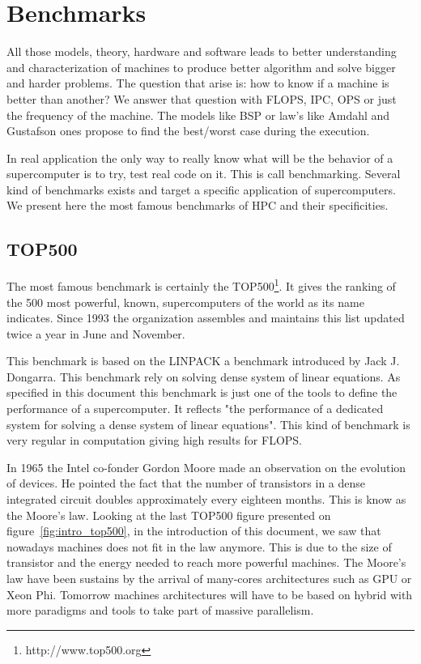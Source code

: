 \section{Benchmarks}
All those models, theory, hardware and software leads to better understanding and characterization of machines to produce better algorithm and solve bigger and harder problems. 
The question that arise is: how to know if a machine is better than another? 
We answer that question with FLOPS, IPC, OPS or just the frequency of the machine. 
The models like BSP or law's like Amdahl and Gustafson ones propose to find the best/worst case during the execution.

In real application the only way to really know what will be the behavior of a supercomputer is to try, test real code on it. 
This is call benchmarking.
Several kind of benchmarks exists and target a specific application of supercomputers. 
We present here the most famous benchmarks of HPC and their specificities.

\subsection{TOP500}
The most famous benchmark is certainly the TOP500\footnote{http://www.top500.org}. 
It gives the ranking of the 500 most powerful, known, supercomputers of the world as its name indicates.
Since 1993 the organization assembles and maintains this list updated twice a year in June and November.

This benchmark is based on the LINPACK\cite{dongarra1994top500} a benchmark introduced by Jack J. Dongarra.
This benchmark rely on solving  dense system of linear equations. 
As specified in this document this benchmark is just one of the tools to define the performance of a supercomputer. 
It reflects "the performance of a dedicated system for solving a dense system of linear equations".
This kind of benchmark is very regular in computation giving high results for FLOPS. 

In 1965 the Intel co-fonder Gordon Moore made an observation\cite{present2000cramming} on the evolution of devices. 
He pointed the fact that the number of transistors in a dense integrated circuit doubles approximately every eighteen months.
This is know as the Moore's law. 
Looking at the last TOP500 figure presented on figure~\ref{fig:intro_top500}, in the introduction of this document, we saw that nowadays machines does not fit in the law anymore. 
This is due to the size of transistor and the energy needed to reach more powerful machines. 
The Moore's law have been sustains by the arrival of many-cores architectures such as GPU or Xeon Phi. 
Tomorrow machines architectures will have to be based on hybrid with more paradigms and tools to take part of massive parallelism.


